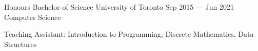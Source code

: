 
\begin{cventries}
  \cventry
    {Honours Bachelor of Science}
    {University of Toronto}
    {}
    {Sep 2015 --- Jun 2021}
    {Computer Science}
    {
      \begin{cvitems}
        \item {Teaching Assistant: Introduction to Programming, Discrete Mathematics, Data Structures}
      \end{cvitems}
    }
\end{cventries}
